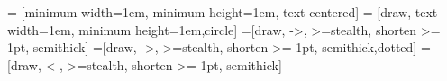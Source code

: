 \documentclass{article}
\begin{document}
    
    
     = [minimum width=1em, minimum height=1em, text centered]
     = [draw, text width=1em, minimum height=1em,circle]
     =[draw, ->, >=stealth, shorten >= 1pt, semithick]
     =[draw, ->, >=stealth, shorten >= 1pt, semithick,dotted]
     =[draw, <-, >=stealth, shorten >= 1pt, semithick]
    
    \def\blockdist{1.25}
    \def\edgedist{1.5}
    \def\encodedist{(-1.5,0)}
    \def\putdist{(0,-1.5)}
    \def\decodedist{(1.5,0)}
    
\end{document}
